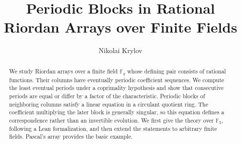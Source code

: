 \documentclass[12pt,reqno]{amsart}
\title[Periodic Blocks in Rational Riordan Arrays]
{Periodic Blocks in Rational Riordan Arrays over Finite Fields}
\author{Nikolai Krylov}
\numberwithin{equation}{subsection}
\theoremstyle{plain}
\theoremstyle{definition}
\begin{document}
\begin{abstract}
We study Riordan arrays over a finite field $\mathbb F_q$ whose defining pair
consists of rational functions. Their columns have eventually periodic
coefficient sequences. We compute the least eventual periods under a
coprimality hypothesis and show that consecutive periods are equal or differ
by a factor of the characteristic. Periodic blocks of neighboring columns
satisfy a linear equation in a circulant quotient ring. The coefficient
multiplying the later block is generally singular, so this equation defines a
correspondence rather than an invertible evolution. We first give the theory
over $\mathbb F_5$, following a Lean formalization, and then extend the
statements to arbitrary finite fields. Pascal's array provides the basic
example.
\end{abstract}

\maketitle







\end{document}
